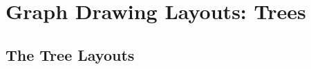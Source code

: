 %
%
%


\section{Graph Drawing Layouts: Trees}
\label{section-first-graphdrawing-library-in-manual}
\label{section-library-graphdrawing-trees}

{}


\subsection{The Tree Layouts}


\endinput


